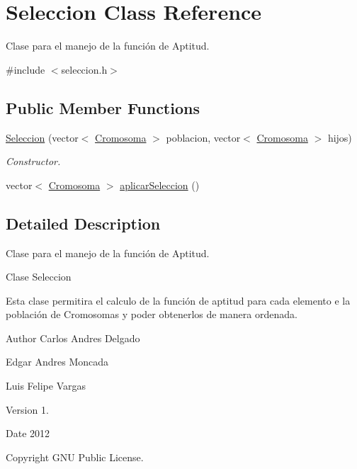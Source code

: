 \hypertarget{classSeleccion}{\section{Seleccion Class Reference}
\label{classSeleccion}
}


Clase para el manejo de la función de Aptitud.  




{\ttfamily \#include $<$seleccion.\-h$>$}

\subsection*{Public Member Functions}
\begin{DoxyCompactItemize}
\item 
\hyperlink{classSeleccion_a98fa8d406a3f543405dab4f25efde0a0}{Seleccion} (vector$<$ \hyperlink{classCromosoma}{Cromosoma} $>$ poblacion, vector$<$ \hyperlink{classCromosoma}{Cromosoma} $>$ hijos)
\begin{DoxyCompactList}\small\item\em Constructor. \end{DoxyCompactList}\item 
vector$<$ \hyperlink{classCromosoma}{Cromosoma} $>$ \hyperlink{classSeleccion_ae8ac58d7995c5807522fa3eba7a17ebb}{aplicar\-Seleccion} ()
\end{DoxyCompactItemize}


\subsection{Detailed Description}
Clase para el manejo de la función de Aptitud. 

\begin{DoxyVerb}Clase Seleccion
\end{DoxyVerb}


Esta clase permitira el calculo de la función de aptitud para cada elemento e la población de Cromosomas y poder obtenerlos de manera ordenada. \begin{DoxyAuthor}{Author}
Carlos Andres Delgado 

Edgar Andres Moncada 

Luis Felipe Vargas 
\end{DoxyAuthor}
\begin{DoxyVersion}{Version}
1. 
\end{DoxyVersion}
\begin{DoxyDate}{Date}
2012 
\end{DoxyDate}
\begin{DoxyCopyright}{Copyright}
G\-N\-U Public License. 
\end{DoxyCopyright}


